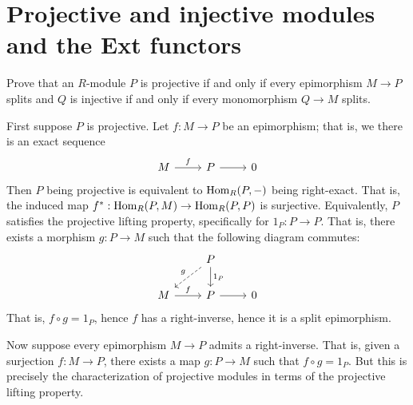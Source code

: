\documentclass[../../master.tex]{subfiles}
\begin{document}
\section{Projective and injective modules and the Ext functors}

\begin{problem}
    Prove that an $R$-module $P$ is projective if and only if every epimorphism $M \to P$ splits and $Q$ is injective if and only if every monomorphism $Q \to M$ splits.
\end{problem}

\begin{solution}
    First suppose $P$ is projective.
    Let $f: M \to P$ be an epimorphism; 
    that is, we there is an exact sequence
    \[
    \begin{tikzcd}
        M & P & 0
        \arrow[from=1-1, to=1-2, "f"]
        \arrow[from=1-2, to=1-3] 
    \end{tikzcd}
    \]
    Then $P$ being projective is equivalent to $\operatorname{Hom}_R(P, -)$ being right-exact.
    That is, the induced map $f^{*} : \operatorname{Hom}_R(P, M) \to \operatorname{Hom}_R(P, P)$ is surjective.
    Equivalently, $P$ satisfies the projective lifting property, specifically for $1_P : P \to P$.
    That is, there exists a morphism $g : P \to M$ such that the following diagram commutes:
    \[
    \begin{tikzcd}
        & P & \\
        M & P & 0
        \arrow[from=1-2, to=2-1, "g"', dashed]
        \arrow[from=1-2, to=2-2, "1_P"] 
        \arrow[from=2-1, to=2-2, "f"]
        \arrow[from=2-2, to=2-3] 
    \end{tikzcd}
    \]
    That is, $f \circ g = 1_P$, hence $f$ has a right-inverse, hence it is a split epimorphism.

    Now suppose every epimorphism $M \to P$ admits a right-inverse.
    That is, given a surjection $f: M \to P$, there exists a map $g : P \to M$ such that $f \circ g = 1_P$.
    But this is precisely the characterization of projective modules in terms of the projective lifting property.


\end{solution}
\end{document}
